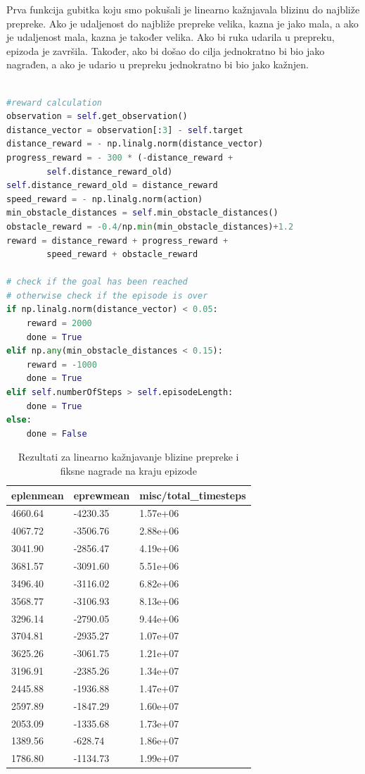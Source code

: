 \documentclass[times,utf8,diplomski]{fer}
\begin{document}
Prva funkcija gubitka koju smo pokušali je linearno kažnjavala blizinu do najbliže prepreke. Ako je udaljenost do najbliže prepreke velika, kazna je jako mala, a ako je udaljenost mala, kazna je također velika. Ako bi ruka udarila u prepreku, epizoda je završila. Također, ako bi došao do cilja jednokratno bi bio jako nagrađen, a ako je udario u prepreku jednokratno bi bio jako kažnjen.

\begin{lstlisting}[caption={Kod za linearno kažnjavanje blizine i fiksne nagrade na kraju epizode},language=Python]

#reward calculation
observation = self.get_observation()
distance_vector = observation[:3] - self.target
distance_reward = - np.linalg.norm(distance_vector)
progress_reward = - 300 * (-distance_reward +
		self.distance_reward_old)
self.distance_reward_old = distance_reward
speed_reward = - np.linalg.norm(action)
min_obstacle_distances = self.min_obstacle_distances()
obstacle_reward = -0.4/np.min(min_obstacle_distances)+1.2
reward = distance_reward + progress_reward +
		speed_reward + obstacle_reward

# check if the goal has been reached
# otherwise check if the episode is over
if np.linalg.norm(distance_vector) < 0.05:
    reward = 2000
    done = True
elif np.any(min_obstacle_distances < 0.15):
    reward = -1000
    done = True
elif self.numberOfSteps > self.episodeLength:
    done = True
else:
    done = False
\end{lstlisting}

\begin{table}[ht!]
\centering
\caption{Rezultati za linearno kažnjavanje blizine prepreke i fiksne nagrade na kraju epizode}
\label{tab:rlk}
\begin{tabular}{@{}lll@{}}
\hline
eplenmean & eprewmean & misc/total\_timesteps \\
\hline
\hline
4660.64 & -4230.35 & 1.57e+06 \\ 
4067.72 & -3506.76 & 2.88e+06 \\ 
3041.90 & -2856.47 & 4.19e+06 \\ 
3681.57 & -3091.60 & 5.51e+06 \\ 
3496.40 & -3116.02 & 6.82e+06 \\ 
3568.77 & -3106.93 & 8.13e+06 \\ 
3296.14 & -2790.05 & 9.44e+06 \\ 
3704.81 & -2935.27 & 1.07e+07 \\ 
3625.26 & -3061.75 & 1.21e+07 \\ 
3196.91 & -2385.26 & 1.34e+07 \\ 
2445.88 & -1936.88 & 1.47e+07 \\ 
2597.89 & -1847.29 & 1.60e+07 \\ 
2053.09 & -1335.68 & 1.73e+07 \\ 
1389.56 & -628.74 & 1.86e+07 \\ 
1786.80 & -1134.73 & 1.99e+07 \\ 
\hline
\end{tabular}
\end{table}
\end{document}
